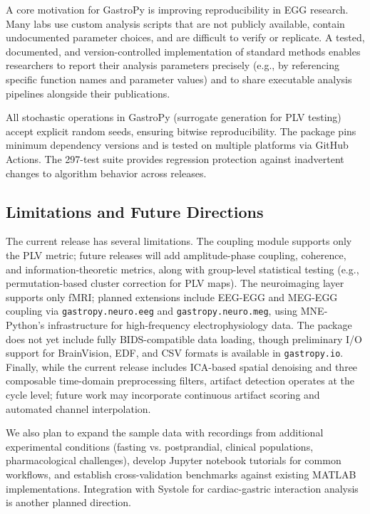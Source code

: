 \documentclass[12pt]{article}
\begin{document}
A core motivation for GastroPy is improving reproducibility in EGG research.
Many labs use custom analysis scripts that are not publicly available, contain
undocumented parameter choices, and are difficult to verify or replicate. A
tested, documented, and version-controlled implementation of standard methods
enables researchers to report their analysis parameters precisely (e.g., by
referencing specific function names and parameter values) and to share
executable analysis pipelines alongside their publications.

All stochastic operations in GastroPy (surrogate generation for PLV testing)
accept explicit random seeds, ensuring bitwise reproducibility. The package
pins minimum dependency versions and is tested on multiple
platforms via GitHub Actions. The 297-test suite provides
regression protection against inadvertent changes to algorithm behavior across
releases.

\subsection{Limitations and Future Directions}

The current release has several limitations. The coupling module supports
only the PLV metric; future releases will add amplitude-phase coupling,
coherence, and information-theoretic metrics, along with group-level
statistical testing (e.g., permutation-based cluster correction for PLV maps).
The neuroimaging layer supports only fMRI; planned extensions include EEG-EGG
and MEG-EGG coupling via \texttt{gastropy.neuro.eeg} and
\texttt{gastropy.neuro.meg}, using MNE-Python's infrastructure for
high-frequency electrophysiology data. The package does not yet include fully
BIDS-compatible data loading, though preliminary I/O support for BrainVision,
EDF, and CSV formats is available in \texttt{gastropy.io}. Finally, while the
current release includes ICA-based spatial denoising and three composable
time-domain preprocessing filters, artifact detection operates at the cycle
level; future work may incorporate continuous artifact scoring and automated
channel interpolation.

We also plan to expand the sample data with recordings from additional
experimental conditions (fasting vs. postprandial, clinical populations,
pharmacological challenges), develop Jupyter notebook tutorials for common
workflows, and establish cross-validation benchmarks against existing MATLAB
implementations. Integration with Systole \citep{Legrand2020} for
cardiac-gastric interaction analysis is another planned direction.
\end{document}
